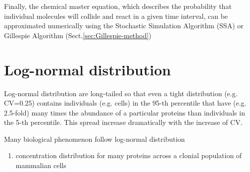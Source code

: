 Finally, the chemical master equation, which describes the probability that
individual molecules will collide and react in a given time interval, can be
approximated numerically using the Stochastic Simulation Algorithm (SSA) or
Gillespie Algorithm (Sect.\ref{sec:Gillespie-method})


\section{Log-normal distribution}
\label{sec:Log-normal-distribution}


Log-normal distribution are long-tailed so that even a tight distribution (e.g.
CV=0.25) contains individuals (e.g. cells) in the 95-th percentile that have
(e.g. 2.5-fold) many times the abundance of a particular proteins than
individuals in the 5-th percentile. This spread increase dramatically with the
increase of CV. 

Many biological phenomenon follow log-normal distribution
\begin{enumerate}
  \item concentration distribution for many proteins across a clonial population
  of mammalian cells
\end{enumerate}